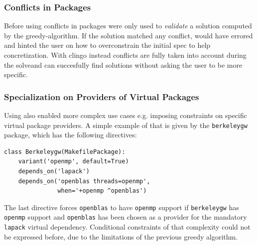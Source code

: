 \subsubsection{Conflicts in Packages}
Before using \clingo{} conflicts in packages were only used to \emph{validate} a solution computed by the greedy-algorithm. If the solution matched any conflict, \spack{} would have errored and hinted the user on how to overconstrain the initial spec to help concretization. With clingo instead conflicts are fully taken into account during the solve\footnotemark and \spack{} can succesfully find solutions without asking the user to be more specific.

\subsubsection{Specialization on Providers of Virtual Packages}
Using \clingo{} also enabled more complex use cases e.g. imposing constraints on specific virtual package providers. A simple example of that is given by the \texttt{berkeleygw} package, which has the following directives:
\begin{verbatim}
class Berkeleygw(MakefilePackage):
    variant('openmp', default=True)
    depends_on('lapack')
    depends_on('openblas threads=openmp', 
               when='+openmp ^openblas')
\end{verbatim}
The last directive forces \texttt{openblas} to have \texttt{openmp} support if \texttt{berkeleygw} has \texttt{openmp} support and \texttt{openblas} has been chosen as a provider for the mandatory \texttt{lapack} virtual dependency. Conditional constraints of that complexity could not be expressed before, due to the limitations of the previous greedy algorithm.
